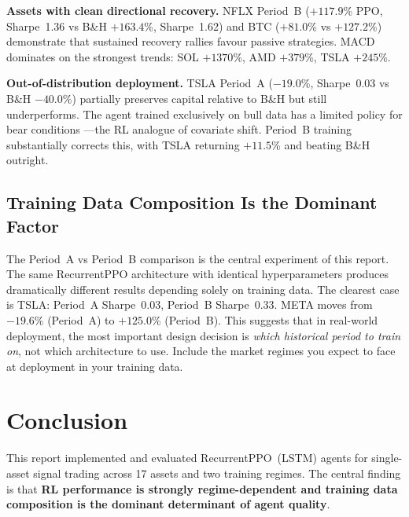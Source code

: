 \documentclass[12pt,a4paper]{article}
\begin{document}
\textbf{Assets with clean directional recovery.}
NFLX Period~B ($+117.9$\% PPO, Sharpe~1.36 vs B\&H $+163.4$\%,
Sharpe~1.62) and BTC ($+81.0$\% vs $+127.2$\%) demonstrate that
sustained recovery rallies favour passive strategies. MACD dominates
on the strongest trends: SOL $+1370$\%, AMD $+379$\%, TSLA $+245$\%.

\textbf{Out-of-distribution deployment.}
TSLA Period~A ($-19.0$\%, Sharpe~0.03 vs B\&H $-40.0$\%) partially
preserves capital relative to B\&H but still underperforms. The agent
trained exclusively on bull data has a limited policy for bear conditions
---the RL analogue of covariate shift. Period~B training substantially
corrects this, with TSLA returning $+11.5$\% and beating B\&H outright.

\subsection{Training Data Composition Is the Dominant Factor}

The Period~A vs Period~B comparison is the central experiment of this
report. The same RecurrentPPO architecture with identical hyperparameters
produces dramatically different results depending solely on training data.
The clearest case is TSLA: Period~A Sharpe~0.03, Period~B Sharpe~0.33.
META moves from $-19.6$\% (Period~A) to $+125.0$\% (Period~B). This
suggests that in real-world deployment, the most important design
decision is \emph{which historical period to train on}, not which
architecture to use. Include the market regimes you expect to face at
deployment in your training data.

\section{Conclusion}

This report implemented and evaluated RecurrentPPO~(LSTM) agents for
single-asset signal trading across 17 assets and two training regimes.
The central finding is that \textbf{RL performance is strongly
regime-dependent and training data composition is the dominant determinant
of agent quality}.
\end{document}
